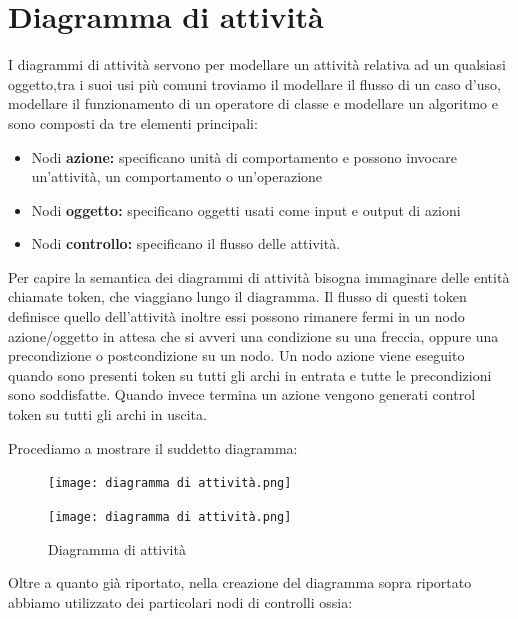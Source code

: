 \documentclass[a4paper, 11pt,oneside]{book}
\newcommand{\spacing}{\par\bigskip\noindent}
\begin{document}
    \section{Diagramma di attività}
        I diagrammi di attività servono per modellare un attività relativa ad un qualsiasi oggetto,tra i suoi usi più comuni troviamo il modellare il flusso di un caso d'uso, modellare il funzionamento di un operatore di classe e modellare un algoritmo e sono composti da tre elementi principali:
        \begin{itemize}
            \item Nodi \textbf{azione:} specificano unità di comportamento e possono invocare un'attività, un comportamento o un'operazione
            \item Nodi \textbf{oggetto:} specificano oggetti usati come input e output di azioni
            \item Nodi \textbf{controllo:} specificano il flusso delle attività.
        \end{itemize}
        Per capire la semantica dei diagrammi di attività bisogna immaginare delle entità chiamate token, che viaggiano lungo il diagramma. Il flusso di questi token definisce quello dell'attività inoltre essi possono rimanere fermi in un nodo azione/oggetto in attesa che si avveri una condizione su una freccia,
        oppure una precondizione o postcondizione su un nodo. Un nodo azione viene eseguito quando sono presenti token su tutti gli archi in entrata e tutte le precondizioni sono soddisfatte. Quando invece termina un azione vengono generati control token su tutti gli archi in uscita.
        \spacing
        Procediamo a mostrare il suddetto diagramma:
        \begin{figure}[H]
            \centering
            \texttt{[image: diagramma di attività.png]}
        \end{figure}
        \begin{figure}[H]
            \continuedfloat
            \centering
            \texttt{[image: diagramma di attività.png]}
            \caption{Diagramma di attività}
            \label{fig:diagramma_attività}
        \end{figure}
        \spacing
        Oltre a quanto già riportato, nella creazione del diagramma sopra riportato abbiamo utilizzato dei particolari nodi di controlli ossia:
\end{document}
